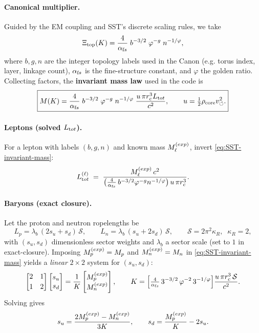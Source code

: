 \documentclass[11pt]{article}
\begin{document}
\paragraph{Canonical multiplier.}
    Guided by the EM coupling and SST’s discrete scaling rules, we take
    \[
        \Xi_{\text{top}}(K)=\frac{4}{\alpha_{\textrm fs}}\;b^{-3/2}\;\varphi^{-g}\;n^{-1/\varphi},
    \]
    where $b,g,n$ are the integer topology labels used in the Canon (e.g. torus index, layer, linkage count), $\alpha_{\textrm fs}$ is the fine-structure constant, and $\varphi$ the golden ratio. Collecting factors, the \textbf{invariant mass law} used in the code is
    \begin{equation*}
    \boxed{M(K)=\frac{4}{\alpha_{\textrm fs}}\;b^{-3/2}\;\varphi^{-g}\;n^{-1/\varphi}\;
    \frac{u\,\pi r_c^3 L_{\textrm tot}}{c^2},
        \qquad
        u=\tfrac{1}{2}\rho_{\text{core}}v_{\circlearrowleft}^2.
    }\label{eq:SST-invariant-mass}
    \end{equation*}

\paragraph{Leptons (solved $L_{\textrm tot}$).}
    For a lepton with labels $(b,g,n)$ and known mass $M_\ell^{\textrm(exp)}$, invert \eqref{eq:SST-invariant-mass}:
    \[
        L_{\textrm tot}^{(\ell)} \;=\;
        \frac{M_\ell^{\textrm(exp)}\,c^2}{\big(\tfrac{4}{\alpha_{\textrm fs}}\,b^{-3/2}\varphi^{-g}n^{-1/\varphi}\big)\,u\,\pi r_c^3}.
    \]

\paragraph{Baryons (exact closure).}
    Let the proton and neutron ropelengths be
    \[
        L_p=\lambda_b\,(2s_u+s_d)\,\mathcal S,\qquad
        L_n=\lambda_b\,(s_u+2s_d)\,\mathcal S,\qquad
        \mathcal S=2\pi^2\kappa_R,\;\;\kappa_R=2,
    \]
    with $(s_u,s_d)$ dimensionless sector weights and $\lambda_b$ a sector scale (set to $1$ in exact-closure).
    Imposing $M_p^{\textrm(exp)}=M_p$ and $M_n^{\textrm(exp)}=M_n$ in \eqref{eq:SST-invariant-mass} yields a \emph{linear} $2\times2$ system for $(s_u,s_d)$:
    \[
        \begin{bmatrix}
        2 & 1\\[2pt]
        1 & 2
        \end{bmatrix}
        \begin{bmatrix}
        s_u\\ s_d
        \end{bmatrix}
        =
        \frac{1}{K}
        \begin{bmatrix}
        M_p^{\textrm(exp)}\\ M_n^{\textrm(exp)}
        \end{bmatrix},
        \qquad
        K=\Big[\tfrac{4}{\alpha_{\textrm fs}}\,3^{-3/2}\,\varphi^{-2}\,3^{-1/\varphi}\Big]\frac{u\,\pi r_c^3\,\mathcal S}{c^2}.
    \]
    Solving gives
    \[
        s_u=\frac{2M_p^{\textrm(exp)}-M_n^{\textrm(exp)}}{3K},
        \qquad
        s_d=\frac{M_p^{\textrm(exp)}}{K}-2s_u.
    \]
\end{document}
